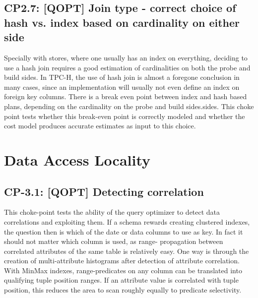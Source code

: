 \subsection*{CP2.7: [QOPT] Join type - correct choice of hash vs. index based on cardinality on either side}
\label{choke_point_2.7}
Specially with stores, where one usually has an index on everything, deciding to use a hash join requires a good estimation of cardinalities on both the probe and build sides. In TPC-H, the use of hash join is almost a foregone conclusion in many cases, since an implementation will usually not even define an index on foreign key columns. There is a break even point between index and hash based plans, depending on the cardinality on the probe and build sides.sides. This choke point tests whether this break-even point is correctly modeled and whether the cost model produces accurate estimates as input to this choice.

%



\section{Data Access Locality}

\subsection*{CP-3.1: [QOPT] Detecting correlation}
\label{choke_point_3.1}


This choke-point tests the ability of the query optimizer to detect data correlations and exploiting them. If a schema rewards creating clustered indexes, the question then is which of the date or data columns to use as key.
In fact it should not matter which column is used, as range- propagation between correlated attributes of the same table is relatively easy. One way is through the creation of multi-attribute histograms after detection of attribute correlation.
With MinMax indexes, range-predicates on any column can be translated into qualifying tuple position ranges. If an attribute value is correlated with tuple position, this reduces the area to scan roughly equally to predicate selectivity.

